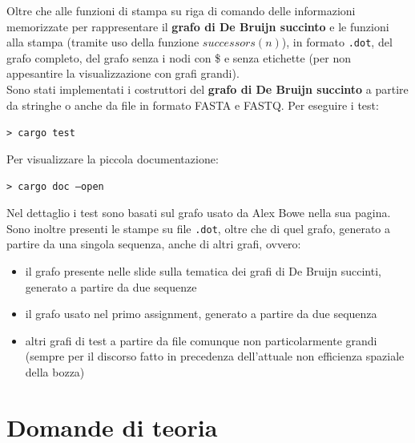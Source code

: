 \documentclass[a4paper,12pt, oneside]{book}
\begin{document}
Oltre che alle funzioni di stampa su riga di comando delle informazioni
memorizzate per rappresentare il \textbf{grafo di De Bruijn succinto} e le
funzioni alla stampa (tramite uso della funzione $successors(n)$), in formato
\texttt{.dot}, del grafo completo, del grafo senza i nodi con \$ e senza
etichette (per non appesantire la visualizzazione con grafi grandi).\\
Sono stati implementati i costruttori del \textbf{grafo di De Bruijn succinto} a
partire da stringhe o anche da file in formato FASTA e FASTQ.
\newpage
\noindent
Per eseguire i test:
\begin{shaded}
  \noindent
  \texttt{> cargo test}
\end{shaded}
\noindent
Per visualizzare la piccola documentazione:
\begin{shaded}
  \noindent
  \texttt{> cargo doc --open}
\end{shaded}
\noindent
Nel dettaglio i test sono basati sul grafo usato da Alex Bowe nella sua
pagina.\\
Sono inoltre presenti le stampe su file \texttt{.dot}, oltre che di quel grafo,
generato a partire da una singola sequenza, anche di altri grafi, ovvero:
\begin{itemize}
  \item il grafo presente nelle slide sulla tematica dei grafi di De Bruijn
  succinti, generato a partire da due sequenze
  \item il grafo usato nel primo assignment, generato a partire da due sequenza
  \item altri grafi di test a partire da file comunque non particolarmente
  grandi (sempre per il discorso fatto in precedenza dell'attuale non efficienza
  spaziale della bozza)
\end{itemize}
\chapter{Domande di teoria}
\end{document}
